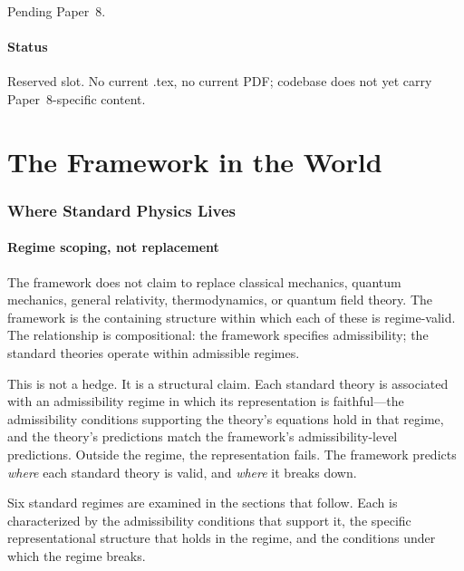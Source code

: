 \documentclass[11pt]{article}
\begin{document}
Pending Paper~8.

\subsection{Status}\label{sec:P8_status}

Reserved slot. No current .tex, no current PDF; codebase does not yet carry Paper~8-specific content.

\clearpage

\part{The Framework in the World}

\section{Where Standard Physics Lives}\label{sec:regimes}

\subsection{Regime scoping, not replacement}\label{sec:regime_scoping}

The framework does not claim to replace classical mechanics, quantum mechanics, general relativity, thermodynamics, or quantum field theory. The framework is the containing structure within which each of these is regime-valid. The relationship is compositional: the framework specifies admissibility; the standard theories operate within admissible regimes.

This is not a hedge. It is a structural claim. Each standard theory is associated with an admissibility regime in which its representation is faithful---the admissibility conditions supporting the theory's equations hold in that regime, and the theory's predictions match the framework's admissibility-level predictions. Outside the regime, the representation fails. The framework predicts \emph{where} each standard theory is valid, and \emph{where} it breaks down.

Six standard regimes are examined in the sections that follow. Each is characterized by the admissibility conditions that support it, the specific representational structure that holds in the regime, and the conditions under which the regime breaks.
\end{document}

